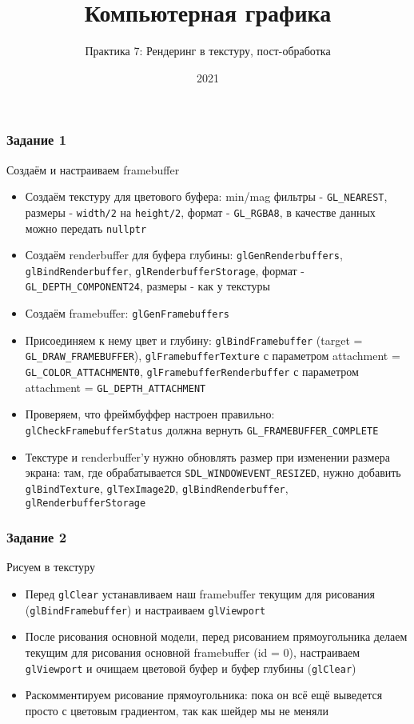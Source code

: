\documentclass{beamer}
\title{Компьютерная графика}
\subtitle{Практика 7: Рендеринг в текстуру, пост-обработка}
\date{2021}
\begin{document}
\frame{\titlepage}

\begin{frame}[fragile]
\frametitle{Задание 1}
\fontsize{10pt}{10pt}
Создаём и настраиваем framebuffer
\begin{itemize}
\item Создаём текстуру для цветового буфера: min/mag фильтры - \verb|GL_NEAREST|, размеры - \verb|width/2| на \verb|height/2|, формат - \verb|GL_RGBA8|, в качестве данных можно передать \verb|nullptr|
\pause
\item Создаём renderbuffer для буфера глубины: \verb|glGenRenderbuffers|, \verb|glBindRenderbuffer|, \verb|glRenderbufferStorage|, формат - \verb|GL_DEPTH_COMPONENT24|, размеры - как у текстуры
\pause
\item Создаём framebuffer: \verb|glGenFramebuffers|
\pause
\item Присоединяем к нему цвет и глубину: \verb|glBindFramebuffer| (target = \verb|GL_DRAW_FRAMEBUFFER|), \verb|glFramebufferTexture| с параметром attachment = \verb|GL_COLOR_ATTACHMENT0|, \verb|glFramebufferRenderbuffer| с параметром attachment = \verb|GL_DEPTH_ATTACHMENT|
\pause
\item Проверяем, что фреймбуффер настроен правильно: \verb|glCheckFramebufferStatus| должна вернуть \verb|GL_FRAMEBUFFER_COMPLETE|
\pause
\item Текстуре и renderbuffer'у нужно обновлять размер при изменении размера экрана: там, где обрабатывается \verb|SDL_WINDOWEVENT_RESIZED|, нужно добавить \verb|glBindTexture|, \verb|glTexImage2D|, \verb|glBindRenderbuffer|, \verb|glRenderbufferStorage|
\end{itemize}
\end{frame}

\begin{frame}[fragile]
\frametitle{Задание 2}
Рисуем в текстуру
\begin{itemize}
\item Перед \verb|glClear| устанавливаем наш framebuffer текущим для рисования (\verb|glBindFramebuffer|) и настраиваем \verb|glViewport|
\pause
\item После рисования основной модели, перед рисованием прямоугольника делаем текущим для рисования основной framebuffer (id = 0), настраиваем \verb|glViewport| и очищаем цветовой буфер и буфер глубины (\verb|glClear|)
\pause
\item Раскомментируем рисование прямоугольника: пока он всё ещё выведется просто с цветовым градиентом, так как шейдер мы не меняли
\end{itemize}
\end{frame}
\end{document}
